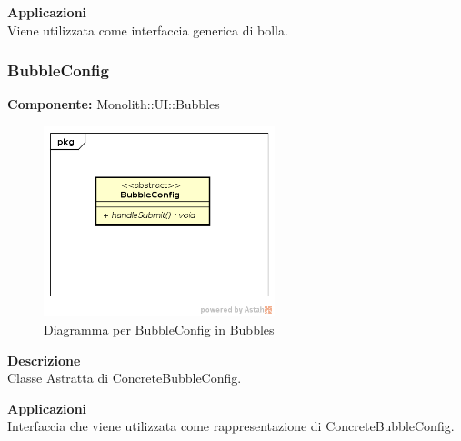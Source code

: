 \textbf{Applicazioni}\\
Viene utilizzata come interfaccia generica di bolla. 


\clearpage

\subsubsection{BubbleConfig}
\textbf{Componente:}  Monolith::UI::Bubbles\\
   \FloatBarrier
   \begin{figure}[ht]
   \centering
   \includegraphics[width=0.6\textwidth]{img/single-BubbleConfig}
   \caption{{Diagramma per BubbleConfig in Bubbles}}
\end{figure}
\FloatBarrier
\textbf{Descrizione}\\
Classe Astratta di ConcreteBubbleConfig. 


\textbf{Applicazioni}\\
Interfaccia che viene utilizzata come rappresentazione di ConcreteBubbleConfig. 


\clearpage

